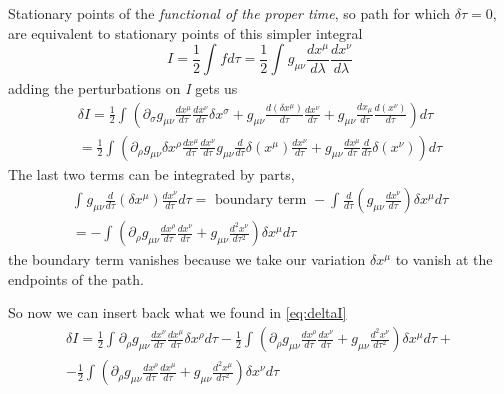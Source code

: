 Stationary points of the \emph{functional of the proper time}, so path for which $\delta  \tau =0$, are equivalent to stationary points of this simpler integral
\[
I = \frac{1}{2} \int_{}^{}{f d\tau } = \frac{1}{2} \int_{}^{}{g_{\mu \nu }\frac{d x^{\mu }}{d \lambda }\frac{d x^{\nu }}{d \lambda }}
\]
adding the perturbations on \emph{I} gets us
\begin{gather*}\label{eq:deltaI}
\delta I = \frac{1}{2} \int_{}^{}{\left( \partial_{\sigma }g_{\mu \nu }\frac{d x^{\mu }}{d \tau }\frac{d x^{\nu }}{d \tau }\delta x^{\sigma } + g_{\mu \nu } \frac{d \left( \delta x^{\mu } \right)}{d \tau }\frac{d x^{\nu }}{d \tau } + g_{\mu \nu }\frac{d x_{\mu }}{d \tau } \frac{d \left( x^{\nu } \right)}{d \tau } \right)d\tau } \\
= \frac{1}{2} \int_{}^{}{\left( \partial_{\rho }g_{\mu \nu }\delta x^{\rho } \frac{d x^{\mu }}{d \tau } \frac{d x^{\nu }}{d \tau } g_{\mu \nu }\frac{d }{d \tau } \delta \left( x^{\mu } \right) \frac{d x^{\nu }}{d \tau } + g_{\mu \nu } \frac{d x^{\mu }}{d \tau } \frac{d }{d \tau } \delta \left( x^{\nu } \right) \right) d\tau }
\end{gather*}
The last two terms can be integrated by parts,
\begin{gather*}
	\int_{}^{}{g_{\mu \nu } \frac{d }{d \tau }\left( \delta x^{\mu } \right) \frac{d x^{\nu }}{d \tau } d\tau } = \text{ boundary term } - \int_{}^{}{\frac{d }{d \tau } \left( g_{\mu \nu }\frac{d x^{\nu }}{d \tau } \right) \delta x^{\mu } d\tau } \\
 = - \int_{}^{}{\left( \partial_{\rho }g_{\mu \nu } \frac{d x^{\rho }}{d \tau } \frac{d x^{\nu }}{d \tau } + g_{\mu \nu } \frac{d ^{2} x^{\nu }}{d \tau ^{2}} \right) \delta x^{\mu } d\tau }
\end{gather*}
the boundary term vanishes because we take our variation $\delta x^{\mu }$ to vanish at the endpoints of the path. \par
So now we can insert back what we found in \ref{eq:deltaI}
\begin{gather*}
\delta I = \frac{1}{2} \int_{}^{}{\partial_{\rho }g_{\mu \nu } \frac{d x^{\nu }}{d \tau } \frac{d x^{\mu  }}{d \tau } \delta x^{\rho } d\tau } - \frac{1}{2} \int_{}^{}{\left( \partial_{\rho } g_{\mu \nu } \frac{d x^{\rho }}{d \tau } \frac{d x^{\nu }}{d \tau } + g_{\mu \nu } \frac{d ^{2}x^{\nu }}{d \tau ^{2}} \right) \delta x^{\mu }d\tau }  +\\
- \frac{1}{2} \int_{}^{}{\left( \partial_{\rho } g_{\mu \nu } \frac{d x^{\rho }}{d \tau } \frac{d x^{\mu }}{d \tau } + g_{\mu \nu } \frac{d ^{2} x^{\mu }}{d \tau ^{2}} \right) \delta x^{\nu } d\tau }
\end{gather*}
